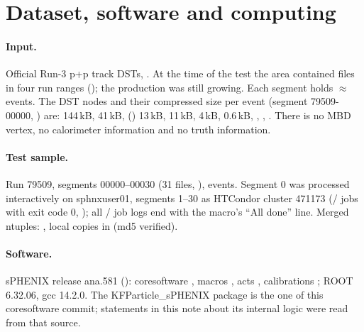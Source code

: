 \section{Dataset, software and computing}
\label{sec:dataset}

\paragraph{Input.} Official Run-3 p+p track DSTs,
.
At the time of the test the area contained \nDSTfiles{} files in four run ranges
(); the production was still growing. Each segment holds
$\approx$\evPerFile{} events. The DST nodes and their compressed size per event (segment
79509-00000, ) are:  144\,kB,
 41\,kB,  () 13\,kB,
 11\,kB,  4\,kB,
 0.6\,kB, , , . There is no
MBD vertex, no calorimeter information and no truth information.

\paragraph{Test sample.} Run 79509, segments 00000--00030 (31 files,
), \nEvents{} events. Segment 0 was processed interactively on
sphnxuser01, segments 1--30 as HTCondor cluster 471173 (\nCondorOK/\nCondorJobs{} jobs with exit
code 0, ); all \nKFPdone/\nKFPlogs{} job logs end with the macro's
``All done'' line. Merged ntuples:
,
local copies in  (md5 verified).


\paragraph{Software.} sPHENIX release ana.581 ():
coresoftware , macros , acts ,
calibrations ; ROOT 6.32.06, gcc 14.2.0. The KFParticle\_sPHENIX package is the
one of this coresoftware commit; statements in this note about its internal logic were read from
that source.

